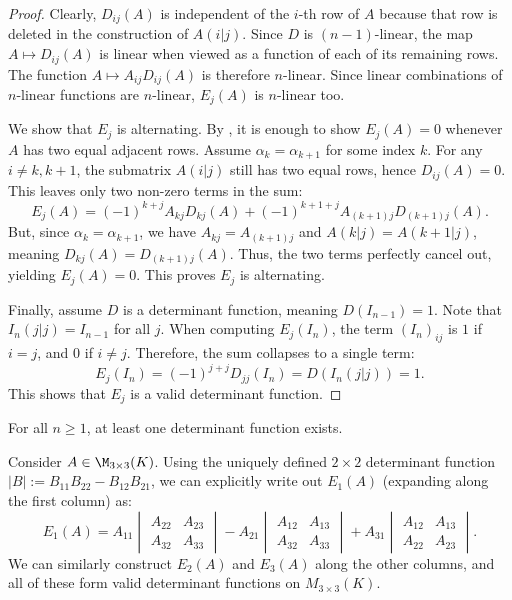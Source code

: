 \begin{proof}
  Clearly, $D_{ij}(A)$ is independent of the $i$-th row of $A$ because that row is deleted in the construction of $A(i|j)$. Since $D$ is $(n-1)$-linear, the map $A \mapsto D_{ij}(A)$ is linear when viewed as a function of each of its remaining rows. The function $A \mapsto A_{ij} D_{ij}(A)$ is therefore $n$-linear. Since linear combinations of $n$-linear functions are $n$-linear, $E_j(A)$ is $n$-linear too.

  We show that $E_j$ is alternating. By , it is enough to show $E_j(A) = 0$ whenever $A$ has two equal adjacent rows.
  Assume $\alpha_k = \alpha_{k+1}$ for some index $k$. For any $i \neq k, k+1$, the submatrix $A(i|j)$ still has two equal rows, hence $D_{ij}(A) = 0$. This leaves only two non-zero terms in the sum:
  \[
  E_j(A) = (-1)^{k+j} A_{kj} D_{kj}(A) + (-1)^{k+1+j} A_{(k+1)j} D_{(k+1)j}(A).
  \] %
  But, since $\alpha_k = \alpha_{k+1}$, we have $A_{kj} = A_{(k+1)j}$ and $A(k|j) = A(k+1|j)$, meaning $D_{kj}(A) = D_{(k+1)j}(A)$. Thus, the two terms perfectly cancel out, yielding $E_j(A) = 0$. This proves $E_j$ is alternating.

  Finally, assume $D$ is a determinant function, meaning $D(I_{n-1}) = 1$. Note that $I_n(j|j) = I_{n-1}$ for all $j$. When computing $E_j(I_n)$, the term $(I_n)_{ij}$ is $1$ if $i=j$, and $0$ if $i \neq j$. Therefore, the sum collapses to a single term:
  \[
  E_j(I_n) = (-1)^{j+j} D_{jj}(I_n) = D(I_n(j|j)) = 1.
  \]
  This shows that $E_j$ is a valid determinant function.
\end{proof}

\begin{corollary}\label{cor:det_exists}
  For all $n \ge 1$, at least one determinant function exists.
\end{corollary}

\begin{example}
  Consider $A \in \M_{3 \times 3}(K)$. Using the uniquely defined $2 \times 2$ determinant function $|B| := B_{11}B_{22} - B_{12}B_{21}$, we can explicitly write out $E_1(A)$ (expanding along the first column) as:
  \[
  E_1(A) = A_{11} \begin{vmatrix} A_{22} & A_{23} \\ A_{32} & A_{33} \end{vmatrix} - A_{21} \begin{vmatrix} A_{12} & A_{13} \\ A_{32} & A_{33} \end{vmatrix} + A_{31} \begin{vmatrix} A_{12} & A_{13} \\ A_{22} & A_{23} \end{vmatrix}.
  \]
  We can similarly construct $E_2(A)$ and $E_3(A)$ along the other columns, and all of these form valid determinant functions on $M_{3 \times 3}(K)$.
\end{example}

